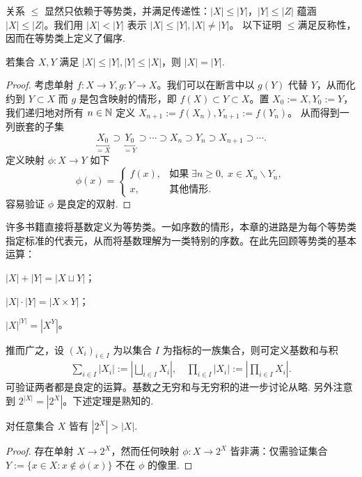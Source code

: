 关系 $\leqslant$ 显然只依赖于等势类，并满足传递性：$|X| \leqslant |Y|$，$|Y| \leqslant |Z|$ 蕴涵 $|X| \leqslant |Z|$。我们用 $|X| < |Y|$ 表示 $|X| \leqslant |Y|,|X| \neq |Y|$。 以下证明 $\leqslant $满足反称性，因而在等势类上定义了偏序.

\begin{theorem}\label{prop:Schröder-Bernstein}
	若集合 $X,Y$ 满足 $|X| \leqslant |Y|, |Y| \leqslant |X|$，则 $|X|=|Y|$.
\end{theorem}
\begin{proof}
	考虑单射 $f: X \to Y, g: Y \to X$。我们可以在断言中以 $g(Y)$ 代替 $Y$，从而化约到 $Y \subset X$ 而 $g$ 是包含映射的情形，即 $f(X) \subset Y \subset X$。置 $X_0 := X,Y_0 := Y$，我们递归地对所有 $n \in \mathbb{N}$ 定义 $X_{n+1} := f(X_n), Y_{n+1} := f(Y_n)$。
	从而得到一列嵌套的子集
	\[ \underbracket{X_0}_{=X} \supset \underbracket{Y_0}_{=Y} \supset \cdots \supset X_n \supset Y_n \supset X_{n+1} \supset \cdots .\]
	定义映射 $\phi: X \to Y$ 如下
	\[ \phi(x) = \begin{cases}
		f(x), & \text{如果}\; \exists n \geqslant 0,\; x \in X_n \backslash Y_n,\\
		x, & \text{其他情形}.
	\end{cases} \]
	容易验证 $\phi$ 是良定的双射.
\end{proof}

许多书籍直接将基数定义为等势类。一如序数的情形，本章的进路是为每个等势类指定标准的代表元，从而将基数理解为一类特别的序数。在此先回顾等势类的基本运算：
\begin{inparaenum}[(i)]
	\item $|X|+|Y| = |X \sqcup Y|$；
	\item $|X| \cdot |Y| = |X \times Y|$；
	\item $|X|^{|Y|} = |X^Y|$。
\end{inparaenum}
推而广之，设 $(X_i)_{i \in I}$ 为以集合 $I$ 为指标的一族集合，则可定义基数和与积
\begin{gather}
	\sum_{i \in I} |X_i| := \left\lvert \bigsqcup_{i \in I} X_i \right\rvert, \quad \prod_{i \in I} |X_i| := \left\lvert \prod_{i \in I} X_i \right\rvert.
\end{gather}
可验证两者都是良定的运算。基数之无穷和与无穷积的进一步讨论从略.
另外注意到 $2^{|X|} = |2^X|$。下述定理是熟知的.
\begin{theorem}[Cantor]\label{prop:Cantor}
	对任意集合 $X$ 皆有 $|2^X| > |X|$.
\end{theorem}
\begin{proof}
	存在单射 $X \to 2^X$，然而任何映射 $\phi: X \to 2^X$ 皆非满：仅需验证集合 $Y := \{x \in X : x \notin \phi(x) \}$ 不在 $\phi$ 的像里.
\end{proof}


